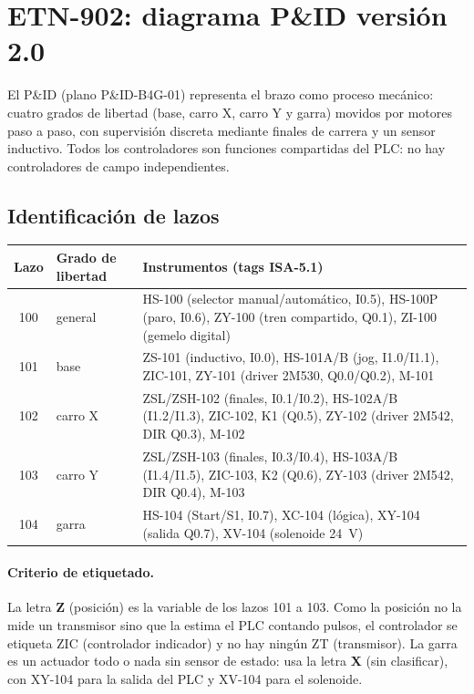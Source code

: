 \documentclass[a4paper,11pt]{article}
\begin{document}
\section{ETN-902: diagrama P\&ID versión 2.0}
El P\&ID (plano P\&ID-B4G-01) representa el brazo como proceso mecánico: cuatro grados de libertad (base, carro X, carro Y y garra) movidos por motores paso a paso, con supervisión discreta mediante finales de carrera y un sensor inductivo. Todos los controladores son funciones compartidas del PLC: no hay controladores de campo independientes.


\subsection{Identificación de lazos}
\begin{center}\small
\begin{tabularx}{\linewidth}{c >{\raggedright}p{2.2cm} >{\raggedright\arraybackslash}X}
\toprule
\textbf{Lazo} & \textbf{Grado de libertad} & \textbf{Instrumentos (tags ISA-5.1)}\\
\midrule
100 & general & HS-100 (selector manual/automático, I0.5), HS-100P (paro, I0.6), ZY-100 (tren compartido, Q0.1), ZI-100 (gemelo digital)\\
101 & base & ZS-101 (inductivo, I0.0), HS-101A/B (jog, I1.0/I1.1), ZIC-101, ZY-101 (driver 2M530, Q0.0/Q0.2), M-101\\
102 & carro X & ZSL/ZSH-102 (finales, I0.1/I0.2), HS-102A/B (I1.2/I1.3), ZIC-102, K1 (Q0.5), ZY-102 (driver 2M542, DIR Q0.3), M-102\\
103 & carro Y & ZSL/ZSH-103 (finales, I0.3/I0.4), HS-103A/B (I1.4/I1.5), ZIC-103, K2 (Q0.6), ZY-103 (driver 2M542, DIR Q0.4), M-103\\
104 & garra & HS-104 (Start/S1, I0.7), XC-104 (lógica), XY-104 (salida Q0.7), XV-104 (solenoide 24~V)\\
\bottomrule
\end{tabularx}
\end{center}

\paragraph{Criterio de etiquetado.} La letra \textbf{Z} (posición) es la variable de los lazos 101 a 103. Como la posición no la mide un transmisor sino que la estima el PLC contando pulsos, el controlador se etiqueta ZIC (controlador indicador) y no hay ningún ZT (transmisor). La garra es un actuador todo o nada sin sensor de estado: usa la letra \textbf{X} (sin clasificar), con XY-104 para la salida del PLC y XV-104 para el solenoide.
\end{document}
